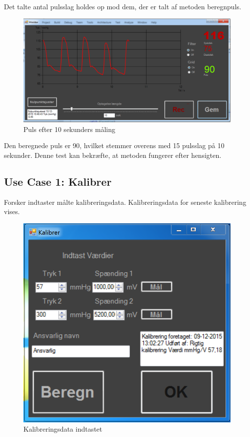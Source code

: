 Det talte antal pulsslag holdes op mod dem, der er talt af metoden beregnpuls.

\begin{figure}[H]
	\centering
	\includegraphics[width=1\textwidth]{Figurer/Pulstest_monitor}
	\caption{Puls efter 10 sekunders måling}
\end{figure}


Den beregnede puls er 90, hvilket stemmer overens med 15 pulsslag på 10 sekunder. Denne test kan bekræfte, at metoden fungerer efter hensigten.

\subsection{Use Case 1: Kalibrer}

Forsker indtaster målte kalibreringsdata. Kalibreringsdata for seneste kalibrering vises.

\begin{figure}[H]
	\centering
	\includegraphics[width=1\textwidth]{Figurer/Test_Kalibrer_1}
	\caption{Kalibreringsdata indtastet}
\end{figure}

